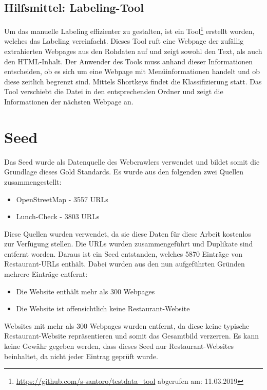 \subsection{Hilfsmittel: Labeling-Tool}
Um das manuelle Labeling effizienter zu gestalten, ist ein Tool\footnote{\url{https://github.com/s-santoro/testdata_tool} abgerufen am: 11.03.2019} erstellt worden, welches das Labeling vereinfacht.
Dieses Tool ruft eine Webpage der zufällig extrahierten Webpages aus den Rohdaten auf und zeigt sowohl den Text, als auch den HTML-Inhalt.
Der Anwender des Tools muss anhand dieser Informationen entscheiden, ob es sich um eine Webpage mit Menüinformationen handelt und ob diese zeitlich begrenzt sind.
Mittels Shortkeys findet die Klassifizierung statt.
Das Tool verschiebt die Datei in den entsprechenden Ordner und zeigt die Informationen der nächsten Webpage an.
\section{Seed}
Das Seed wurde als Datenquelle des Webcrawlers verwendet und bildet somit die Grundlage dieses Gold Standards.
Es wurde aus den folgenden zwei Quellen zusammengestellt:
\begin{itemize}
	\item OpenStreetMap - 3557 URLs
	\item Lunch-Check - 3803 URLs
\end{itemize}
Diese Quellen wurden verwendet, da sie diese Daten für diese Arbeit kostenlos zur Verfügung stellen.
Die URLs wurden zusammengeführt und Duplikate sind entfernt worden.
Daraus ist ein Seed entstanden, welches 5870 Einträge von Restaurant-URLs enthält.
Dabei wurden aus den nun aufgeführten Gründen mehrere Einträge entfernt:
\begin{itemize}
	\item Die Website enthält mehr als 300 Webpages
	\item Die Website ist offensichtlich keine Restaurant-Website
\end{itemize}
Websites mit mehr als 300 Webpages wurden entfernt, da diese keine typische Restaurant-Website repräsentieren und somit das Gesamtbild verzerren.
Es kann keine Gewähr gegeben werden, dass dieses Seed nur Restaurant-Websites beinhaltet, da nicht jeder Eintrag geprüft wurde.
